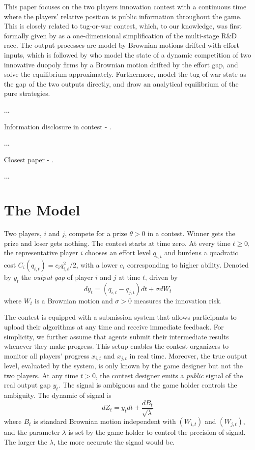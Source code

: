 \documentclass[mnsc]{informs3}
\begin{document}
This paper focuses on the two players innovation contest with a continuous time  where the players’ relative position is public information throughout the game.
This is closely related to tug-or-war contest, which, to our knowledge, was first formally given by \citet{Harris1987Race} as a one-dimensional simplification of the multi-stage R\&D race. 
The output processes are model by Brownian motions drifted with effort inputs, which is followed by \cite{budd1993model} who model the state of a dynamic competition of two innovative duopoly firms by a Brownian motion drifted by the effort gap, and solve the equilibrium approximately. 
Furthermore, \citet{Moscarini2007Contest} model the tug-of-war state as the gap of the two outputs directly, and draw an analytical equilibrium of the pure strategies. 

...

Information disclosure in contest - \cite{Bimpikis2019Contest}. 

...

Closest paper - \cite{ryvkin2022fight}.

...




\section{The Model}

Two players, $i$ and $j$, compete for a prize $\theta>0$ in a contest. 
Winner gets the prize and loser gets nothing. 
The contest starts at time zero. 
At every time $t\ge0$, the representative player $i$ chooses an effort level $q_{i,t}$ and burdens a quadratic cost $C_i(q_{i,t}) = c_i q_{i,t}^2/2$, with a lower $c_i$ corresponding to higher ability. 
Denoted by $y_t$ the \textit{output gap} of player $i$ and $j$ at time $t$, driven by
\begin{equation}\label{eq-state-dynamics}
	dy_t = (q_{i,t}-q_{j,t})dt + \sigma dW_t
\end{equation}
where $W_t$ is a Brownian motion and $\sigma>0$ measures the innovation risk.

The contest is equipped with a submission system that allows participants to upload their algorithms at any time and receive immediate feedback. 
For simplicity, we further assume that agents submit their intermediate results whenever they make progress. 
This setup enables the contest organizers to monitor all players’ progress $x_{i,t}$ and $x_{j,t}$ in real time. 
Moreover, the true output level, evaluated by the system, is only known by the game designer but not the two players. 
At any time $t>0$, the contest designer emits a \textit{public} signal of the real output gap $y_t$. 
The signal is ambiguous and the game holder controls the ambiguity. 
The dynamic of signal is  
\begin{equation}\label{signal}
	dZ_{t} = y_{t}dt + \frac{dB_{t}}{\sqrt{\lambda}} 
\end{equation}
where $B_{t}$ is standard Brownian motion independent with $(W_{i,t})$ and $(W_{j,t})$, and the parameter $\lambda$ is set by the game holder to control the precision of signal. 
The larger the $\lambda$, the more accurate the signal would be. 
\end{document}

